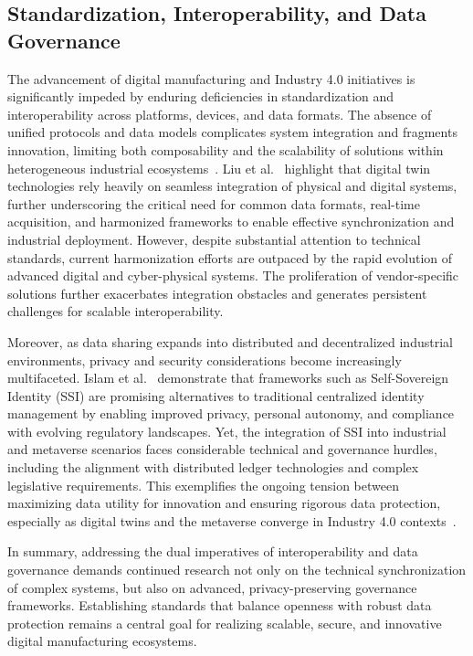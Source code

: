 \documentclass[sigconf]{acmart}
\begin{document}
\subsection{Standardization, Interoperability, and Data Governance}

The advancement of digital manufacturing and Industry 4.0 initiatives is significantly impeded by enduring deficiencies in standardization and interoperability across platforms, devices, and data formats. The absence of unified protocols and data models complicates system integration and fragments innovation, limiting both composability and the scalability of solutions within heterogeneous industrial ecosystems~\cite{ref91,ref92}. Liu et al.~\cite{ref91} highlight that digital twin technologies rely heavily on seamless integration of physical and digital systems, further underscoring the critical need for common data formats, real-time acquisition, and harmonized frameworks to enable effective synchronization and industrial deployment. However, despite substantial attention to technical standards, current harmonization efforts are outpaced by the rapid evolution of advanced digital and cyber-physical systems. The proliferation of vendor-specific solutions further exacerbates integration obstacles and generates persistent challenges for scalable interoperability.

Moreover, as data sharing expands into distributed and decentralized industrial environments, privacy and security considerations become increasingly multifaceted. Islam et al.~\cite{ref92} demonstrate that frameworks such as Self-Sovereign Identity (SSI) are promising alternatives to traditional centralized identity management by enabling improved privacy, personal autonomy, and compliance with evolving regulatory landscapes. Yet, the integration of SSI into industrial and metaverse scenarios faces considerable technical and governance hurdles, including the alignment with distributed ledger technologies and complex legislative requirements. This exemplifies the ongoing tension between maximizing data utility for innovation and ensuring rigorous data protection, especially as digital twins and the metaverse converge in Industry 4.0 contexts~\cite{ref92}. 

In summary, addressing the dual imperatives of interoperability and data governance demands continued research not only on the technical synchronization of complex systems, but also on advanced, privacy-preserving governance frameworks. Establishing standards that balance openness with robust data protection remains a central goal for realizing scalable, secure, and innovative digital manufacturing ecosystems.
\end{document}
